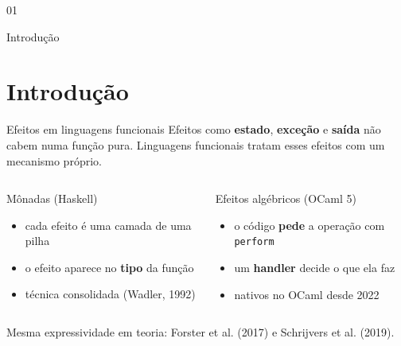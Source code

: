\documentclass[aspectratio=169,10pt,xcolor={table}]{beamer}
\newcommand{\transicao}[2]{%
  \begin{frame}[plain]
    \centering\vfill
    {\fontsize{13}{15}\selectfont\color{secao}#1\par}\vskip3mm
    {\titulofonte\fontsize{24}{28}\selectfont\color{texto}#2\par}
    \vfill
  \end{frame}}
\begin{document}
\transicao{01}{Introdução}
\section{Introdução}

\begin{frame}{Efeitos em linguagens funcionais}
  Efeitos como \textbf{estado}, \textbf{exceção} e \textbf{saída} não cabem numa função pura.
  Linguagens funcionais tratam esses efeitos com um mecanismo próprio.
  \vskip2.5mm
  \begin{columns}[T]
    \begin{caixa}{Mônadas (Haskell)}
      \begin{itemize}
        \item cada efeito é uma camada de uma pilha
        \item o efeito aparece no \textbf{tipo} da função
        \item técnica consolidada (Wadler, 1992)
      \end{itemize}
    \end{caixa}
    \begin{caixa}{Efeitos algébricos (OCaml 5)}
      \begin{itemize}
        \item o código \textbf{pede} a operação com \texttt{perform}
        \item um \textbf{handler} decide o que ela faz
        \item nativos no OCaml desde 2022
      \end{itemize}
    \end{caixa}
  \end{columns}
  \vskip2.5mm
  Mesma expressividade em teoria: Forster et al. (2017) e Schrijvers et al. (2019).
\end{frame}
\end{document}
